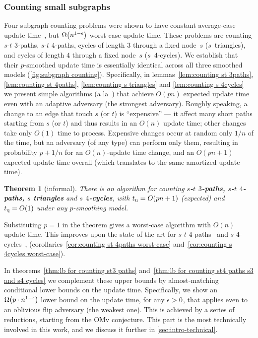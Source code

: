 \documentclass[letter,11pt]{article}
\newtheorem{atheorem}{Theorem}[section]
\newcommand{\omv}{\textnormal{\textsf{OMv}}\xspace}
\newcommand{\paths}[3]{${#1}$-${#2}$ ${#3}$-paths\xspace}
\newcommand{\tu}{t_{\textnormal{u}}}
\newcommand{\tq}{t_{\textnormal{q}}}
\begin{document}
\subsubsection{Counting small subgraphs}
Four subgraph counting problems were shown to have constant average-case update time~\cite{HLS22}, but $\Omega\left(n^{1-\eps}\right)$ worst-case update time.
These problems are counting \paths st3, \paths st4, cycles of length $3$ through a fixed node~$s$ ($s$~triangles), and cycles of length $4$ through a fixed node~$s$ ($s$~$4$-cycles).
We establish that their $p$-smoothed update time is essentially identical across all three smoothed models (\cref{fig:subgraph counting}). 
Specifically, in
lemmas~\ref{lem:counting st 3paths},
\ref{lem:counting st 4paths},
\ref{lem:counting s triangles} and 
\ref{lem:counting s 4cycles}
we present simple algorithms (a la~\cite{HLS22}) that achieve $O(pn)$ expected update time even with an adaptive adversary (the strongest adversary).
Roughly speaking, a change to an edge that touch $s$ (or $t$) is ``expensive'' --- it affect many short paths starting from $s$ (or $t$) and thus results in an $O(n)$ update time; other changes take only $O(1)$ time to process.
Expensive changes occur at random only $1/n$ of the time, but an adversary (of any type) can perform only them, resulting in probability $p + 1/n$ for an $O(n)$-update time change, and an $O(pn+1)$ expected update time overall
(which translates to the same amortized update time).

\begin{atheorem}[informal]
	\label{athm:small subgraphs-alg}
There is an algorithm for counting \textbf{\paths{s}{t}{3}, \paths{s}{t}{4}, $s$ triangles} and \textbf{$s$ $4$-cycles}, with 
	 $\tu=O(pn+1)$ (expected)
	and $\tq=O(1)$ 
	under any $p$-smoothing model.
\end{atheorem}

Substituting $p=1$ in the theorem gives a worst-case algorithm with $O(n)$ update time.
This improves upon the state of the art for \paths st4~\cite{DemetrescuI04} and $s$ 4-cycles~\cite{HanauerHH22}, (corollaries~\ref{cor:counting st 4paths worst-case} and~\ref{cor:counting s 4cycles worst-case}).

In theorems~\ref{thm:lb for counting st3 paths} and~\ref{thm:lb for counting st4 paths s3 and s4 cycles} we complement these upper bounds by almost-matching conditional lower bounds on the update time.
Specifically, we show an $\Omega\left(p \cdot  n^{1-\eps}\right)$ lower bound on the update time, for any $\epsilon>0$, that applies even to an oblivious flip adversary (the weakest one).
This is achieved by a series of reductions, starting from the \omv conjecture.
This part is the most technically involved in this work, and we discuss it further in \cref{sec:intro-technical}.
\end{document}
